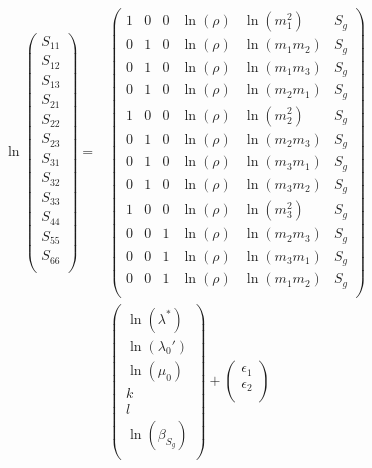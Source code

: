 \documentclass[a4paper,fleqn]{DC_ArtStyle}
\begin{document}
	\begin{equation}
	\begin{split}
	\ln
	\begin{pmatrix}
	S_{11} \\
	S_{12} \\
	S_{13} \\
	S_{21} \\
	S_{22} \\
	S_{23} \\
	S_{31} \\
	S_{32} \\
	S_{33} \\
	S_{44} \\
	S_{55} \\
	S_{66} \\
	\end{pmatrix} = &\begin{pmatrix}
	1 & 0 & 0 & \ln(\rho) & \ln(m_1^2) & S_g \\
	0 & 1 & 0 & \ln(\rho) & \ln(m_1 m_2) & S_g \\
	0 & 1 & 0 & \ln(\rho) & \ln(m_1 m_3) & S_g \\
	0 & 1 & 0 & \ln(\rho) & \ln(m_2 m_1) & S_g \\
	1 & 0 & 0 & \ln(\rho) & \ln(m_2^2) & S_g \\
	0 & 1 & 0 & \ln(\rho) & \ln(m_2 m_3) & S_g \\
	0 & 1 & 0 & \ln(\rho) & \ln(m_3 m_1) & S_g \\
	0 & 1 & 0 & \ln(\rho) & \ln(m_3 m_2) & S_g \\
	1 & 0 & 0 & \ln(\rho) & \ln(m_3^2) & S_g \\
	0 & 0 & 1 & \ln(\rho) & \ln(m_2 m_3) & S_g \\
	0 & 0 & 1 & \ln(\rho) & \ln(m_3 m_1) & S_g \\
	0 & 0 & 1 & \ln(\rho) & \ln(m_1 m_2) & S_g \\
	\end{pmatrix} \\ & \begin{pmatrix}
	\ln(\lambda^{*}) \\
	\ln(\lambda_0') \\
	\ln(\mu_0) \\
	k \\
	l \\
	\ln(\beta_{S_g})\\
	\end{pmatrix} + \begin{pmatrix}
	\epsilon_{1} \\
	\epsilon_{2} \\

\end{pmatrix}
\end{split}
\end{equation}
\end{document}
